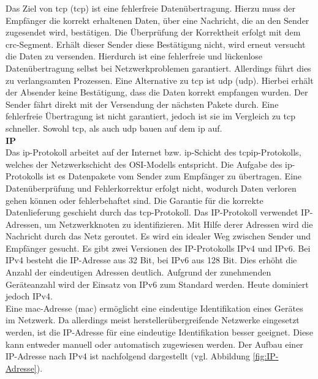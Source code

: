 \documentclass[ a4paper,
                oneside,
                toc=bibliography,
                toc=listof
                ]{scrbook}
\begin{document}
	Das Ziel von \acs{tcp} (\acl{tcp}) ist eine fehlerfreie Datenübertragung. Hierzu muss der Empfänger die korrekt erhaltenen Daten, über eine Nachricht, die an den Sender zugesendet wird, bestätigen. Die Überprüfung der Korrektheit erfolgt mit dem \acs{crc}-Segment. Erhält dieser Sender diese Bestätigung nicht, wird erneut versucht die Daten zu versenden. Hierdurch ist eine fehlerfreie und lückenlose Datenübertragung selbst bei Netzwerkproblemen garantiert. Allerdings führt dies zu verlangsamten Prozessen. Eine Alternative zu \acs{tcp} ist \acs{udp} (\acl{udp}). Hierbei erhält der Absender keine Bestätigung, dass die Daten korrekt empfangen wurden. Der Sender fährt direkt mit der Versendung der nächsten Pakete durch. Eine fehlerfreie Übertragung ist nicht garantiert, jedoch ist sie im Vergleich zu \acs{tcp} schneller. Sowohl \acs{tcp}, als auch \acs{udp} bauen auf dem \ac{ip} auf. \cite{CS9_TCP} \vspace{0.5\baselineskip}\\
	\textbf{IP} \\
	Das \ac{ip}-Protokoll arbeitet auf der Internet bzw. \ac{ip}-Schicht des \ac{tcpip}-Protokolls, welches der Netzwerkschicht des OSI-Modells entspricht. Die Aufgabe des \acs{ip}-Protokolls ist es Datenpakete vom Sender zum Empfänger zu übertragen. Eine Datenüberprüfung und Fehlerkorrektur erfolgt nicht, wodurch Daten verloren gehen können oder fehlerbehaftet sind. Die Garantie für die korrekte Datenlieferung geschieht durch das \acs{tcp}-Protokoll. Das IP-Protokoll verwendet IP-Adressen, um Netzwerkknoten zu identifizieren. Mit Hilfe derer Adressen wird die Nachricht durch das Netz \glqq geroutet\grqq. Es wird ein idealer Weg zwischen Sender und Empfänger gesucht. \cite{harnisch2009netzwerktechnik} \cite{riggert2002rechnernetze} Es gibt zwei Versionen des IP-Protokolls IPv4 und IPv6. Bei IPv4 besteht die IP-Adresse aus 32 Bit, bei IPv6 aus 128 Bit. Dies erhöht die Anzahl der eindeutigen Adressen deutlich. Aufgrund der zunehmenden Geräteanzahl wird der Einsatz von IPv6 zum Standard werden. Heute dominiert jedoch IPv4. \cite{riggert2002rechnernetze} \\
	Eine \acs{mac}-Adresse (\acl{mac}) ermöglicht eine eindeutige Identifikation eines Gerätes im Netzwerk. Da allerdings meist herstellerübergreifende Netzwerke eingesetzt werden, ist die IP-Adresse für eine eindeutige Identifikation besser geeignet. Diese kann entweder manuell oder automatisch zugewiesen werden. Der Aufbau einer IP-Adresse nach IPv4 ist nachfolgend dargestellt (vgl. Abbildung \ref{fig:IP-Adresse}).  \cite{hering2012elektrotechnik} \\
\end{document}

